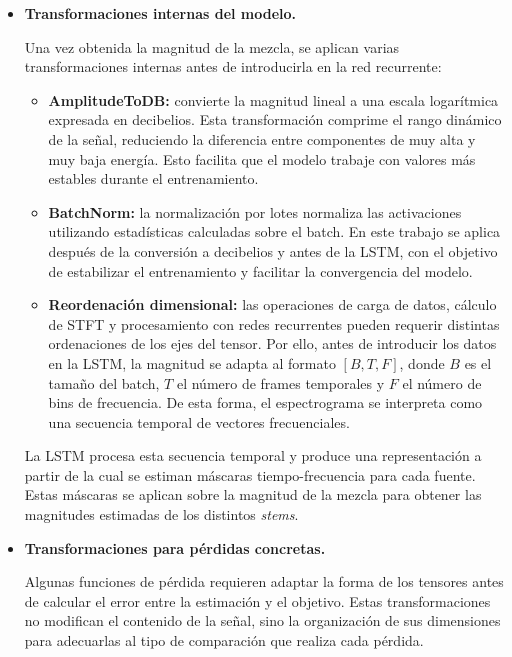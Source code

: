\begin{itemize}
    \item \textbf{Transformaciones internas del modelo.}

    Una vez obtenida la magnitud de la mezcla, se aplican varias transformaciones internas antes de introducirla en la red recurrente:

    \begin{itemize}
        \item \textbf{AmplitudeToDB:} convierte la magnitud lineal a una escala logarítmica expresada en decibelios. Esta transformación comprime el rango dinámico de la señal, reduciendo la diferencia entre componentes de muy alta y muy baja energía. Esto facilita que el modelo trabaje con valores más estables durante el entrenamiento.

        \item \textbf{BatchNorm:} la normalización por lotes normaliza las activaciones utilizando estadísticas calculadas sobre el batch. En este trabajo se aplica después de la conversión a decibelios y antes de la LSTM, con el objetivo de estabilizar el entrenamiento y facilitar la convergencia del modelo.

        \item \textbf{Reordenación dimensional:} las operaciones de carga de datos, cálculo de STFT y procesamiento con redes recurrentes pueden requerir distintas ordenaciones de los ejes del tensor. Por ello, antes de introducir los datos en la LSTM, la magnitud se adapta al formato \([B,T,F]\), donde \(B\) es el tamaño del batch, \(T\) el número de frames temporales y \(F\) el número de bins de frecuencia. De esta forma, el espectrograma se interpreta como una secuencia temporal de vectores frecuenciales.
    \end{itemize}

    La LSTM procesa esta secuencia temporal y produce una representación a partir de la cual se estiman máscaras tiempo-frecuencia para cada fuente. Estas máscaras se aplican sobre la magnitud de la mezcla para obtener las magnitudes estimadas de los distintos \textit{stems}.

    \item \textbf{Transformaciones para pérdidas concretas.}

    Algunas funciones de pérdida requieren adaptar la forma de los tensores antes de calcular el error entre la estimación y el objetivo. Estas transformaciones no modifican el contenido de la señal, sino la organización de sus dimensiones para adecuarlas al tipo de comparación que realiza cada pérdida.


\end{itemize}
